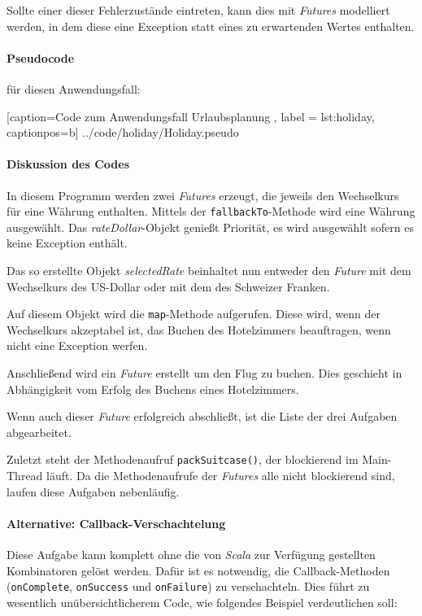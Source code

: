 Sollte einer dieser Fehlerzustände eintreten, kann dies mit \emph{Futures} 
modelliert werden, in dem diese eine Exception statt eines zu 
erwartenden Wertes enthalten.

\paragraph{Pseudocode} für diesen Anwendungsfall:


    [caption={Code zum Anwendungsfall \glqq Urlaubsplanung\grqq{} },
       label = lst:holiday,
       captionpos=b]
 {../code/holiday/Holiday.pseudo}
 
\paragraph{Diskussion des Codes}

In diesem Programm werden zwei \emph{Futures} erzeugt, die jeweils
den Wechselkurs für eine Währung enthalten. Mittels der
\texttt{fallbackTo}-Methode wird eine Währung ausgewählt.
Das \emph{rateDollar}-Objekt genießt Priorität, es wird ausgewählt
sofern es keine Exception enthält.

Das so erstellte Objekt \emph{selectedRate} beinhaltet nun entweder
den \emph{Future} mit dem Wechselkurs des US-Dollar oder mit dem des
Schweizer Franken.

Auf diesem Objekt wird die \texttt{map}-Methode aufgerufen. Diese wird,
wenn der Wechselkurs akzeptabel ist, das Buchen des Hotelzimmers beauftragen,
wenn nicht eine Exception werfen.

Anschließend wird ein \emph{Future} erstellt um den Flug zu buchen. Dies
geschieht in Abhängigkeit vom Erfolg des Buchens eines Hotelzimmers.

Wenn auch dieser \emph{Future} erfolgreich abschließt, ist die
Liste der drei Aufgaben abgearbeitet.

Zuletzt steht der Methodenaufruf \texttt{packSuitcase()}, der blockierend
im Main-Thread läuft. Da die Methodenaufrufe der \emph{Futures} alle
nicht blockierend sind, laufen diese Aufgaben nebenläufig.

\paragraph{Alternative: Callback-Verschachtelung} Diese Aufgabe kann
komplett ohne die von \emph{Scala} zur Verfügung gestellten
Kombinatoren gelöst werden. Dafür ist es notwendig, die Callback-Methoden
(\texttt{onComplete}, \texttt{onSuccess} und \texttt{onFailure}) zu
verschachteln. Dies führt zu wesentlich unübersichtlicherem Code,
wie folgendes Beispiel verdeutlichen soll:

